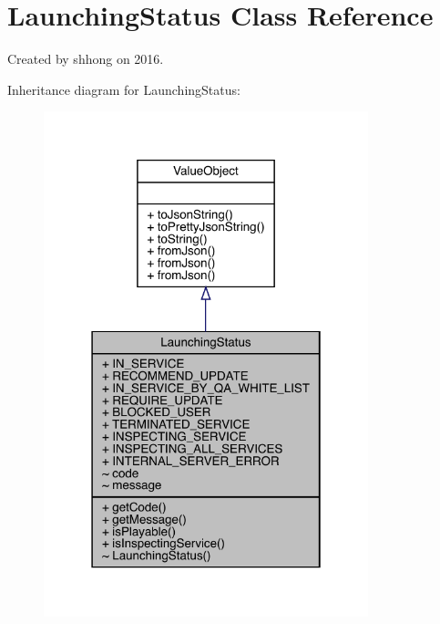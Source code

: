 \hypertarget{classcom_1_1toast_1_1android_1_1gamebase_1_1launching_1_1data_1_1_launching_status}{}\section{Launching\+Status Class Reference}
\label{classcom_1_1toast_1_1android_1_1gamebase_1_1launching_1_1data_1_1_launching_status}


Created by shhong on 2016.  




Inheritance diagram for Launching\+Status\+:\nopagebreak
\begin{figure}[H]
\begin{center}
\leavevmode
\includegraphics[width=267pt]{classcom_1_1toast_1_1android_1_1gamebase_1_1launching_1_1data_1_1_launching_status__inherit__graph}
\end{center}
\end{figure}


